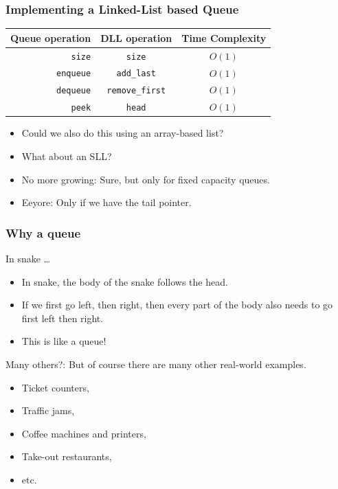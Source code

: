 \begin{frame}
	\frametitle{Implementing a Linked-List based Queue}
			\begin{tabular}{r | c c}
				Queue operation & DLL operation & Time Complexity \\
				\midrule
				\texttt{size} & \texttt{size} & $O(1)$ \\
				\texttt{enqueue} & \texttt{add\_last} & $O(1)$ \\
				\texttt{dequeue}  & \texttt{remove\_first} & $O(1)$ \\
				\texttt{peek}  & \texttt{head} & $O(1)$ \\
			\end{tabular}
		

				\begin{itemize}
					\item Could we also do this using an array-based list?	
					\item What about an SLL?
					\item No more growing: 	Sure, but only for fixed capacity queues.
					\item Eeyore:	Only if we have the tail pointer.
				\end{itemize}

\end{frame}

\begin{frame}
	\frametitle{Why a queue}
		In snake \ldots
			\begin{itemize}
				\item In snake, the body of the snake follows the head.
				\item If we first go left, then right, then every part of the body also needs to go first left then right.
				\item This is like a queue!
			\end{itemize}
		
			Many others?:	But of course there are many other real-world examples.
				\begin{itemize}
					\item Ticket counters,
					\item Traffic jams,
					\item Coffee machines and printers,
					\item Take-out restaurants,
					\item etc.
				\end{itemize}
\end{frame}

